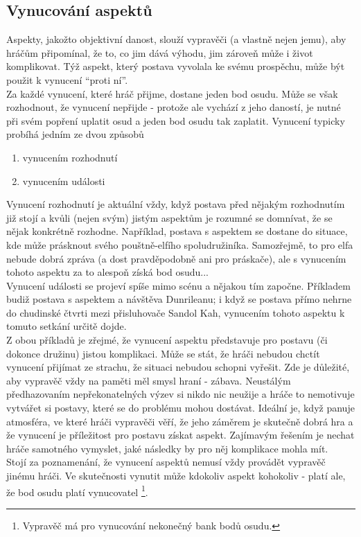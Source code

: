 \subsection{Vynucování aspektů}
\label{sec:vynucovani-aspektu}

Aspekty, jakožto objektivní danost, slouží vypravěči (a vlastně nejen jemu), aby hráčům připomínal, že to, co jim dává výhodu, jim zároveň může i život komplikovat. Týž aspekt, který postava vyvolala ke svému prospěchu, může být použit k vynucení ``proti ní''.\\
Za každé vynucení, které hráč přijme, dostane jeden bod osudu. Může se však rozhodnout, že vynucení nepřijde - protože ale vychází z jeho daností, je nutné při svém popření uplatit osud a jeden bod osudu tak zaplatit. Vynucení typicky probíhá jedním ze dvou způsobů

\begin{enumerate}
\item vynucením rozhodnutí
\item vynucením události
\end{enumerate}

Vynucení rozhodnutí je aktuální vždy, když postava před nějakým rozhodnutím již stojí a kvůli (nejen svým) jistým aspektům je rozumné se domnívat, že se nějak konkrétně rozhodne. Například, postava s aspektem  se dostane do situace, kde může prásknout svého pouštně-elfího spoludružiníka. Samozřejmě, to pro elfa nebude dobrá zpráva (a dost pravděpodobně ani pro práskače), ale s vynucením tohoto aspektu za to alespoň získá bod osudu...\\
Vynucení události se projeví spíše mimo scénu a nějakou tím započne. Příkladem budiž postava s aspektem  a návštěva Dunrileanu; i když se postava přímo nehrne do chudinské čtvrti mezi přisluhovače Sandol Kah, vynucením tohoto aspektu k tomuto setkání určitě dojde.\\

Z obou příkladů je zřejmé, že vynucení aspektu představuje pro postavu (či dokonce družinu) jistou komplikaci. Může se stát, že hráči nebudou chctít vynucení přijímat ze strachu, že situaci nebudou schopni vyřešit. Zde je důležité, aby vypravěč vždy na paměti měl smysl hraní - zábava. Neustálým předhazovaním nepřekonatelných výzev si nikdo nic neužije a hráče to nemotivuje vytvářet si postavy, které se do problému mohou dostávat. Ideální je, když panuje atmosféra, ve které hráči vypravěči věří, že jeho záměrem je skutečně dobrá hra a že vynucení je příležitost pro postavu získat aspekt. Zajímavým řešením je nechat hráče samotného vymyslet, jaké následky by pro něj komplikace mohla mít.\\


Stojí za poznamenání, že vynucení aspektů nemusí vždy provádět vypravěč jinému hráči. Ve skutečnosti vynutit může kdokoliv aspekt kohokoliv - platí ale, že bod osudu platí vynucovatel \footnote{Vypravěč má pro vynucování nekonečný bank bodů osudu.}. 


